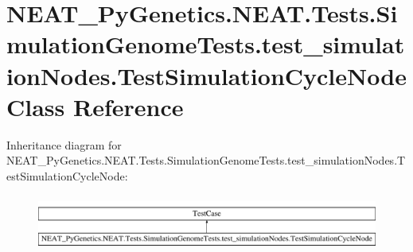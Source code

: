 \hypertarget{class_n_e_a_t___py_genetics_1_1_n_e_a_t_1_1_tests_1_1_simulation_genome_tests_1_1test__simulatio45ecd57ba52657c3e14de63ce24b7f73}{}\section{N\+E\+A\+T\+\_\+\+Py\+Genetics.\+N\+E\+A\+T.\+Tests.\+Simulation\+Genome\+Tests.\+test\+\_\+simulation\+Nodes.\+Test\+Simulation\+Cycle\+Node Class Reference}
\label{class_n_e_a_t___py_genetics_1_1_n_e_a_t_1_1_tests_1_1_simulation_genome_tests_1_1test__simulatio45ecd57ba52657c3e14de63ce24b7f73}
Inheritance diagram for N\+E\+A\+T\+\_\+\+Py\+Genetics.\+N\+E\+A\+T.\+Tests.\+Simulation\+Genome\+Tests.\+test\+\_\+simulation\+Nodes.\+Test\+Simulation\+Cycle\+Node\+:\begin{figure}[H]
\begin{center}
\leavevmode
\includegraphics[height=1.872910cm]{class_n_e_a_t___py_genetics_1_1_n_e_a_t_1_1_tests_1_1_simulation_genome_tests_1_1test__simulatio45ecd57ba52657c3e14de63ce24b7f73}
\end{center}
\end{figure}
